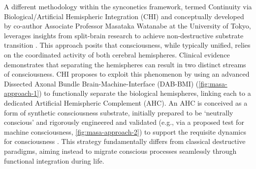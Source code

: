 \documentclass[10pt]{article}
\begin{document}
\begin{sloppypar}
  A different methodology within the synconetics framework, termed Continuity via Biological/Artificial Hemispheric Integration (CHI) and conceptually developed by co-author Associate Professor Masataka Watanabe at the University of Tokyo, leverages insights from split-brain research to achieve non-destructive substrate transition \citep{watanabe2014turing, watanabe2014machine}. This approach posits that consciousness, while typically unified, relies on the coordinated activity of both cerebral hemispheres. Clinical evidence demonstrates that separating the hemispheres can result in two distinct streams of consciousness. CHI proposes to exploit this phenomenon by using an advanced Dissected Axonal Bundle Brain-Machine-Interface (DAB-BMI) (\autoref{fig:masa-approach-1}) to functionally separate the biological hemispheres, linking each to a dedicated Artificial Hemispheric Complement (AHC). An AHC is conceived as a form of synthetic consciousness substrate, initially prepared to be ‘neutrally conscious’ and rigorously engineered and validated (e.g., via a proposed test for machine consciousness, \autoref{fig:masa-approach-2}) to support the requisite dynamics for consciousness \citep{watanabe_biological_2022}. This strategy fundamentally differs from classical destructive paradigms, aiming instead to migrate conscious processes seamlessly through functional integration during life.


\end{sloppypar}
\end{document}
